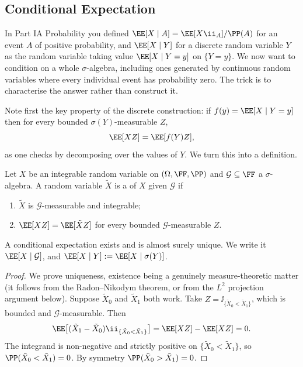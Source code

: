 \subsection{Conditional Expectation}

In Part IA Probability you defined $\EE[X \mid A] = \EE[X\ii_A]/\PP(A)$ for an event $A$ of positive probability, and $\EE[X \mid Y]$ for a discrete random variable $Y$ as the random variable taking value $\EE[X \mid Y = y]$ on $\{Y = y\}$. We now want to condition on a whole $\sigma$-algebra, including ones generated by continuous random variables where every individual event has probability zero. The trick is to characterise the answer rather than construct it.

Note first the key property of the discrete construction: if $f(y) = \EE[X \mid Y=y]$ then for every bounded $\sigma(Y)$-measurable $Z$,
$$
\EE[XZ] = \EE[f(Y)Z],
$$
as one checks by decomposing over the values of $Y$. We turn this into a definition.

\begin{definition}
	Let $X$ be an integrable random variable on $(\Omega,\FF,\PP)$ and $\mathcal{G}\subseteq \FF$ a $\sigma$-algebra. A random variable $\tilde X$ is a  of $X$ given $\mathcal{G}$ if
	\begin{enumerate}[label=(\roman*)]
		\item $\tilde X$ is $\mathcal{G}$-measurable and integrable;
		\item $\EE[XZ] = \EE[\tilde X Z]$ for every bounded $\mathcal{G}$-measurable $Z$.
	\end{enumerate}
\end{definition}

\begin{proposition}
	A conditional expectation exists and is almost surely unique. We write it $\EE[X \mid \mathcal{G}]$, and $\EE[X\mid Y] := \EE[X \mid \sigma(Y)]$.
\end{proposition}

\begin{proof}
	We prove uniqueness, existence being a genuinely measure-theoretic matter (it follows from the Radon--Nikodym theorem, or from the $L^2$ projection argument below). Suppose $\tilde X_0$ and $\tilde X_1$ both work. Take $Z = \ii_{\{\tilde X_0 < \tilde X_1\}}$, which is bounded and $\mathcal{G}$-measurable. Then
	$$
	\EE\big[(\tilde X_1 - \tilde X_0)\ii_{\{\tilde X_0 < \tilde X_1\}}\big] = \EE[XZ] - \EE[XZ] = 0.
	$$
	The integrand is non-negative and strictly positive on $\{\tilde X_0 < \tilde X_1\}$, so $\PP(\tilde X_0 < \tilde X_1) = 0$. By symmetry $\PP(\tilde X_0 > \tilde X_1) = 0$.
\end{proof}

